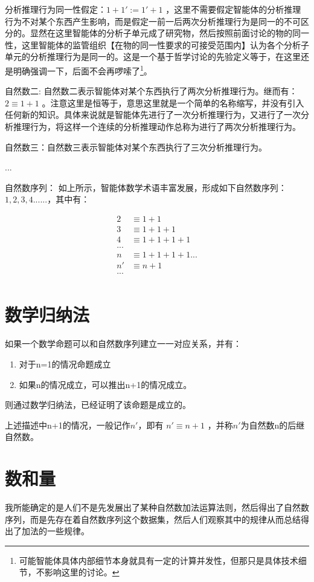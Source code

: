 \documentclass[12pt,oneside]{book}
\begin{document}
分析推理行为同一性假定：$1+1' := 1'+1$ ，这里不需要假定智能体的分析推理行为不对某个东西产生影响，而是假定一前一后两次分析推理行为是同一的不可区分的。显然在这里智能体的分析子单元成了研究物，然后按照前面讨论的物的同一性，这里智能体的监管组织【在物的同一性要求的可接受范围内】认为各个分析子单元的分析推理行为是同一的。这是一个基于哲学讨论的先验定义等于，在这里还是明确强调一下，后面不会再啰嗦了\footnote{可能智能体具体内部细节本身就具有一定的计算并发性，但那只是具体技术细节，不影响这里的讨论。}。

自然数二:  自然数二表示智能体对某个东西执行了两次分析推理行为。继而有：$2 \equiv 1 + 1$ 。注意这里是恒等于，意思这里就是一个简单的名称缩写，并没有引入任何新的知识。具体来说就是智能体先进行了一次分析推理行为，又进行了一次分析推理行为，将这样一个连续的分析推理动作总称为进行了两次分析推理行为。

自然数三：自然数三表示智能体对某个东西执行了三次分析推理行为。

...

自然数序列： 如上所示，智能体数学术语丰富发展，形成如下自然数序列： $1, 2, 3, 4 ......$，其中有：


\begin{align*}
2 &\equiv 1 + 1 \\
3 &\equiv 1 + 1 + 1 \\
4 &\equiv 1 + 1 + 1 + 1 \\
...\\
n &\equiv 1 + 1 + 1 + 1 ...\\
n' &\equiv n + 1\\
...\\
\end{align*}


\section{数学归纳法}
如果一个数学命题可以和自然数序列建立一一对应关系，并有：

\begin{enumerate}
\item 对于n=1的情况命题成立
\item 如果n的情况成立，可以推出n+1的情况成立。
\end{enumerate}

则通过数学归纳法，已经证明了该命题是成立的。

上述描述中n+1的情况，一般记作$n'$，即有 $n'\equiv n+1$ ，并称$n'$为自然数n的后继自然数。


\section{数和量}
我所能确定的是人们不是先发展出了某种自然数加法运算法则，然后得出了自然数序列，而是先存在着自然数序列这个数据集，然后人们观察其中的规律从而总结得出了加法的一些规律。
\end{document}
